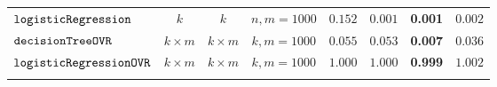 {\begin {table}[t]
\begin{center}
{\begin{tabular}{|| >{\tiny}l || c | c |c || c || l | c | r ||  }
         \hhline{||-||---||-||---||}
         $\mathtt{logisticRegression}$ & $k$ &  $k$ & $ n,m =  1000$ & $ 0.152$  &  $ 0.001$ & {\textbf{0.001}} & {$0.002$}   \\
        \hhline{||-||---||-||---||}
        $\mathtt{decisionTreeOVR}$ & $k \times m$ &  $ k \times m $ & $ k,m =  1000$ &  $0.055$ & $0.053$  &  {\textbf{0.007}} & $0.036$  \\
        \hhline{||-||---||-||---||}
        $\mathtt{logisticRegressionOVR}$  & $k \times m$ &  $ k \times m $ & $ k,m =  1000$ &  $ 1.000  $  &  $ 1.000 $ & {\textbf{ 0.999}} & $ 1.002 $ \\
        \hhline{|:t======== t:|}
\end{tabular}
}
\end{center}
\vspace{-0.5cm}
\end{table}
}


